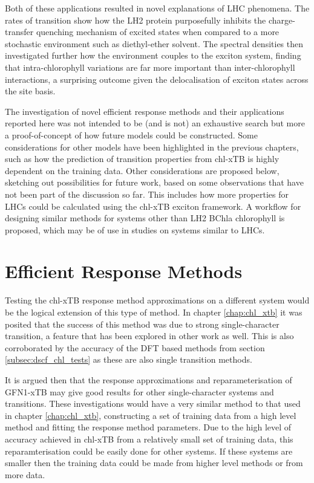 Both of these applications resulted in novel explanations of LHC phenomena. The
rates of transition show how the LH2 protein purposefully inhibits the charge-transfer
quenching mechanism of excited states when compared to a more stochastic environment
such as diethyl-ether solvent. The spectral densities then investigated further 
how the environment couples to the exciton system, finding that intra-chlorophyll
variations are far more important than inter-chlorophyll interactions, a surprising
outcome given the delocalisation of exciton states across the site basis.

The investigation of novel efficient response methods and their applications reported
here was not intended to be (and is not) an exhaustive search but more a proof-of-concept
of how future models could be constructed. Some considerations for other models 
have been highlighted in the previous chapters, such as how the prediction of transition
properties from chl-xTB is highly dependent on the training data. Other considerations
are proposed below, sketching out possibilities for future work, based on some observations
that have not been part of the discussion so far. This includes how more properties 
for LHCs could be calculated using the chl-xTB exciton framework. A workflow for
designing similar methods for systems other than LH2 BChla chlorophyll is proposed,
which may be of use in studies on systems similar to LHCs.

\section{Efficient Response Methods}
\label{sec:future_response_methods}

Testing the chl-xTB response method approximations on a different system would be
the logical extension of this type of method. In chapter \ref{chap:chl_xtb} it was
posited that the success of this method was due to strong single-character transition,
a feature that has been explored in other work as well. This is also corroborated 
by the accuracy of the DFT based \dscf methods from section \ref{subsec:dscf_chl_tests}
as these are also single transition methods.

It is argued then that the response approximations and reparameterisation of GFN1-xTB
may give good results for other single-character systems and transitions. These 
investigations would have a very similar method to that used in chapter \ref{chap:chl_xtb},
constructing a set of training data from a high level method and fitting the response
method parameters. Due to the high level of accuracy achieved in chl-xTB from a
relatively small set of training data, this reparamterisation could be easily done
for other systems. If these systems are smaller then the training data could be 
made from higher level methods or from more data. 

